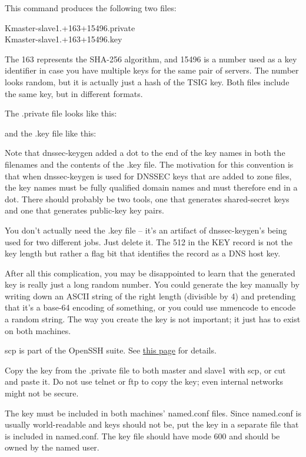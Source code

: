 This command produces the following two files:

{ Kmaster-slave1.+163+15496.private }\\
{Kmaster-slave1.+163+15496.key}

The {163} represents the SHA-256 algorithm, and {15496} is a number used
as a key identifier in case you have multiple keys for the same pair of
servers. The number looks random, but it is actually just a hash of the
TSIG key. Both files include the same key, but in different formats.

The {.private} file looks like this:


and the {.key} file like this:


Note that {dnssec-keygen} added a dot to the end of the key names in
both the filenames and the contents of the {.key} file. The motivation
for this convention is that when {dnssec-keygen} is used for DNSSEC keys
that are added to zone files, the key names must be fully qualified
domain names and must therefore end in a dot. There should probably be
two tools, one that generates shared-secret keys and one that generates
public-key key pairs.

You don't actually need the {.key} file -- it's an artifact of
{dnssec-keygen}'s being used for two different jobs. Just delete it. The
512 in the KEY record is not the key length but rather a flag bit that
identifies the record as a DNS host key.

After all this complication, you may be disappointed to learn that the
generated key is really just a long random number. You could generate
the key manually by writing down an ASCII string of the right length
(divisible by 4) and pretending that it's a base-64 encoding of
something, or you could use {mmencode} to encode a random string. The
way you create the key is not important; it just has to exist on both
machines.

\leavevmode\hypertarget{part0024_split_058.htmlux5cux23_idContainer1032}{}%
{scp} is part of the OpenSSH suite. See
\protect\hyperlink{part0037_split_047.htmlux5cux23_idTextAnchor1737}{this
page} for details.

Copy the key from the {.private} file to both master and slave1 with
{scp}, or cut and paste it. Do not use {telnet} or {ftp} to copy the
key; even internal networks might not be secure.

The key must be included in both machines' {named.conf} files. Since
{named.conf} is usually world-readable and keys should not be, put the
key in a separate file that is included in {named.conf}. The key file
should have mode 600 and should be owned by the {named} user.

